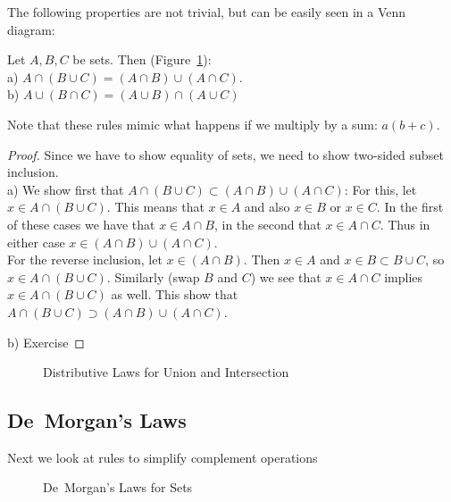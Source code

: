 The following properties are not trivial, but can be easily seen in a Venn
diagram:
\begin{thm}
Let $A,B,C$ be sets. Then (Figure~\ref{figvenndist}):\\
a) $A\cap (B\cup C)=(A\cap B)\cup(A\cap C)$.\\
b) $A\cup (B\cap C)=(A\cup B)\cap(A\cup C)$
\end{thm}
Note that these rules mimic what happens if we multiply by a sum: $a(b+c)$.
\begin{proof}
Since we have to show equality of sets, we need to show two-sided subset
inclusion.\\
a) We show first that $A\cap (B\cup C)\subset (A\cap B)\cup(A\cap C)$: For this,
let $x\in A\cap (B\cup C)$. This means that $x\in A$ and also $x\in B$ or
$x\in C$. In the first of these cases we have that $x\in A\cap B$, in the
second that $x\in A\cap C$. Thus in either case $x\in (A\cap B)\cup (A\cap
C)$. \\
For the reverse inclusion,
let $x\in (A\cap B)$. Then $x\in A$ and $x\in B\subset B\cup C$, so $x\in
A\cap (B\cup C)$. Similarly (swap $B$ and $C$) we see that $x\in A\cap C$
implies $x\in A\cap (B\cup C)$ as well. This show that
$A\cap (B\cup C)\supset (A\cap B)\cup(A\cap C)$.

b) Exercise
\end{proof}

\begin{figure}[t]
\begin{center}
\end{center}
\caption{Distributive Laws for Union and Intersection}
\label{figvenndist}
\end{figure}

\subsection{De~Morgan's Laws}
\label{demorganlaws}

Next we look at rules to simplify complement operations

\begin{figure}[t]
\begin{center}
\end{center}
\caption{De~Morgan's Laws for Sets}
\label{figdemorganset}
\end{figure}

